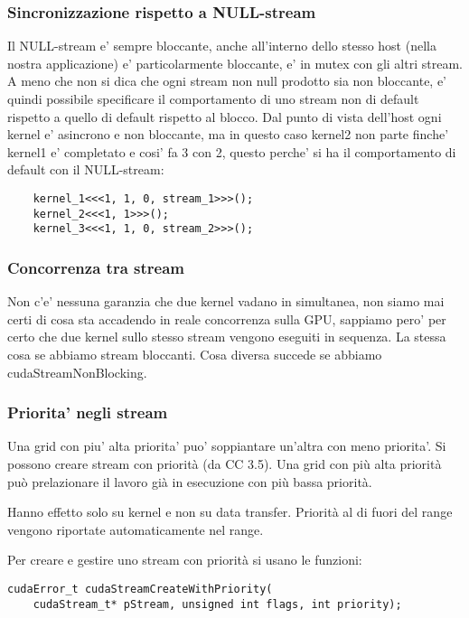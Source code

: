 \subsubsection{Sincronizzazione rispetto a NULL-stream}
Il NULL-stream e' sempre bloccante, anche all'interno dello stesso host (nella nostra applicazione) e' particolarmente bloccante, e' in mutex con gli altri stream. A meno che non si dica che ogni stream non null prodotto sia non bloccante, e' quindi possibile specificare il comportamento di uno stream non di default rispetto a quello di default rispetto al blocco.
Dal punto di vista dell'host ogni kernel e' asincrono e non bloccante, ma in questo caso kernel2 non parte finche' kernel1 e' completato e cosi' fa 3 con 2, questo perche' si ha il comportamento di default con il NULL-stream:
\begin{lstlisting}
    kernel_1<<<1, 1, 0, stream_1>>>();
    kernel_2<<<1, 1>>>();
    kernel_3<<<1, 1, 0, stream_2>>>();
\end{lstlisting}

\subsubsection{Concorrenza tra stream}
Non c'e' nessuna garanzia che due kernel vadano in simultanea, non siamo mai certi di cosa sta accadendo in reale concorrenza sulla GPU, sappiamo pero' per certo che due kernel sullo stesso stream vengono eseguiti in sequenza. La stessa cosa se abbiamo stream bloccanti. Cosa diversa succede se abbiamo cudaStreamNonBlocking.

\subsubsection{Priorita' negli stream}
Una grid con piu' alta priorita' puo' soppiantare un'altra con meno priorita'.
Si possono creare stream con priorità (da CC 3.5). Una grid con più alta priorità può prelazionare il lavoro già in esecuzione con più bassa priorità. 

Hanno effetto solo su kernel e non su data transfer. Priorità al di fuori del range vengono riportate automaticamente nel range.

Per creare e gestire uno stream con priorità si usano le funzioni:
\begin{lstlisting}
cudaError_t cudaStreamCreateWithPriority(
    cudaStream_t* pStream, unsigned int flags, int priority);
\end{lstlisting}

